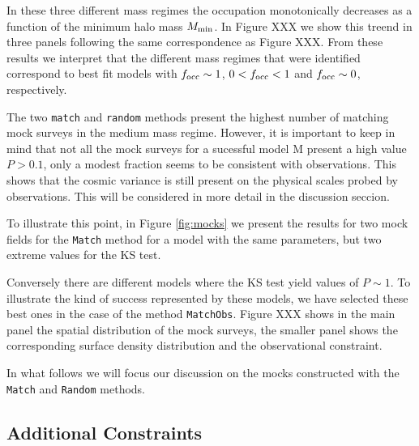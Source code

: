 \documentclass[usenatbib]{mn2e}
\begin{document}
In these three different mass regimes the occupation monotonically
decreases as a function of the minimum halo mass $M_{\rm min}$. In
Figure XXX we show this treend in three panels following the same
correspondence as Figure XXX. From these results we interpret that the
different mass regimes that were identified correspond to best fit
models with $f_{\rm occ}\sim 1$, $0<f_{\rm occ}<1$ and $f_{\rm
  occ}\sim 0$, respectively. 

The two {\tt match} and {\tt random} methods present the highest
number of matching mock surveys in the medium mass regime. However, it
is important to keep in mind that not all the mock surveys for a
sucessful model ${\mathrm M}$ present a high value $P>0.1$, only a
modest fraction seems to be consistent with observations. This shows that the
cosmic variance is still present on the physical scales probed by
observations. This will be considered in more detail in the discussion
seccion. 

To illustrate this point, in Figure \ref{fig:mocks} we present the
results for two mock fields for the {\tt{Match}} method for a model
with the same parameters, but two extreme values for the KS test. 


Conversely there are different models where the KS test yield values of
$P\sim 1$. To illustrate the kind of success represented by these
models, we have selected these best ones in the case of the method
{\tt{MatchObs}}. Figure XXX shows in the main panel the spatial
distribution of the mock surveys, the smaller panel shows the
corresponding surface density distribution and the observational
constraint.  

In what follows we will focus our discussion on the mocks constructed
with the {\tt{Match}} and {\tt{Random}} methods. 

\subsection{Additional Constraints}
\end{document}

